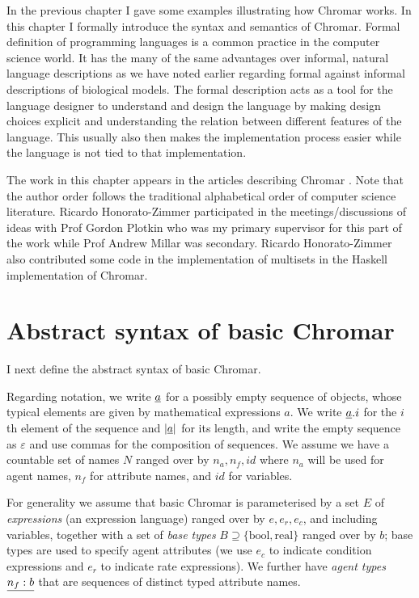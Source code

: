 In the previous chapter I gave some examples illustrating how Chromar works. In
this chapter I formally introduce the syntax and semantics of Chromar. Formal
definition of programming languages is a common practice in the computer science
world. It has the many of the same advantages over informal, natural language
descriptions as we have noted earlier regarding formal against informal
descriptions of biological models. The formal description acts as a tool for the
language designer to understand and design the language by making design choices
explicit and understanding the relation between different features of the
language. This usually also then makes the implementation process easier while
the language is not tied to that implementation.

The work in this chapter appears in the articles describing Chromar
\citep{honorato-zimmer_chromar_2017, honorato-zimmer_chromar_2018}. Note that
the author order follows the traditional alphabetical order of computer science
literature. Ricardo Honorato-Zimmer participated in the meetings/discussions of
ideas with Prof Gordon Plotkin who was my primary supervisor for this part of
the work while Prof Andrew Millar was secondary. Ricardo Honorato-Zimmer also
contributed some code in the implementation of multisets in the Haskell
implementation of Chromar.


\section{Abstract syntax of basic Chromar}
\label{sec:syntax}
I next define the abstract syntax of basic Chromar.

Regarding notation, we write $\underline{a}$ for a possibly empty sequence of objects,
whose typical elements are given by mathematical expressions $a$. We write
$\underline{a}.i$ for the $i$th element of the sequence and $|\underline{a}|$ for its length,
and write the empty sequence as $\varepsilon$ and use commas for the composition
of sequences.  We assume we have a countable set of names $N$ ranged over by
$n_a, n_f, id$ where $n_a$ will be used for agent names, $n_f$ for attribute
names, and $id$ for variables.

For generality we assume that basic Chromar is parameterised by a set $E$ of
\emph{expressions} (an expression language) ranged over by $e, e_r, e_c$, and
including variables, together with a set of \emph{base types}
$B \supseteq \{\mathrm{bool}, \mathrm{real} \}$ ranged over by $b$; base types are used to
specify agent attributes (we use $e_c$ to indicate condition expressions and
$e_r$ to indicate rate expressions).
%
We further have \emph{agent types} $\underline{n_f:b}$ that are sequences of distinct
typed attribute names.

